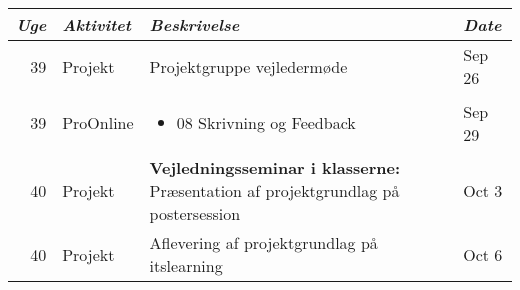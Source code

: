 \begin{longtable}{|r|l|p{}|l|}
  \hline
  \emph{Uge} & \emph{Aktivitet} & \emph{Beskrivelse} & \emph{Date} \\
  \hline
  39 & Projekt & Projektgruppe vejledermøde & Sep 26 \\
  \hline
  39 & ProOnline & \begin{itemize}[noitemsep,leftmargin=*,topsep=0pt,partopsep=0pt]

  \item 08 Skrivning og Feedback

\end{itemize} & Sep 29 \\
  \hline
  40 & Projekt & \textbf{Vejledningsseminar i klasserne:} Præsentation af projektgrundlag på postersession & Oct 3 \\
  \hline
  40 & Projekt & Aflevering af projektgrundlag på itslearning & Oct 6 \\
  \hline
\end{longtable}
